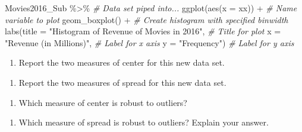 \documentclass[
]{report}
\newenvironment{Shaded}{\begin{snugshade}}{\end{snugshade}}
\newcommand{\AttributeTok}[1]{\textcolor[rgb]{0.77,0.63,0.00}{#1}}
\newcommand{\CommentTok}[1]{\textcolor[rgb]{0.56,0.35,0.01}{\textit{#1}}}
\newcommand{\FunctionTok}[1]{\textcolor[rgb]{0.00,0.00,0.00}{#1}}
\newcommand{\NormalTok}[1]{#1}
\newcommand{\SpecialCharTok}[1]{\textcolor[rgb]{0.00,0.00,0.00}{#1}}
\newcommand{\StringTok}[1]{\textcolor[rgb]{0.31,0.60,0.02}{#1}}
\providecommand{\tightlist}{%
  \setlength{\itemsep}{0pt}\setlength{\parskip}{0pt}}
\begin{document}
\begin{Shaded}
\begin{Highlighting}[]
\NormalTok{Movies2016\_Sub }\SpecialCharTok{\%\textgreater{}\%} \CommentTok{\# Data set piped into...}
\FunctionTok{ggplot}\NormalTok{(}\FunctionTok{aes}\NormalTok{(}\AttributeTok{x =}\NormalTok{ xx)) }\SpecialCharTok{+}   \CommentTok{\# Name variable to plot}
  \FunctionTok{geom\_boxplot}\NormalTok{() }\SpecialCharTok{+}  \CommentTok{\# Create histogram with specified binwidth}
  \FunctionTok{labs}\NormalTok{(}\AttributeTok{title =} \StringTok{"Histogram of Revenue of Movies in 2016"}\NormalTok{, }\CommentTok{\# Title for plot}
       \AttributeTok{x =} \StringTok{"Revenue (in Millions)"}\NormalTok{, }\CommentTok{\# Label for x axis}
       \AttributeTok{y =} \StringTok{"Frequency"}\NormalTok{) }\CommentTok{\# Label for y axis}
\end{Highlighting}
\end{Shaded}

\begin{enumerate}
\def\labelenumi{\arabic{enumi}.}
\setcounter{enumi}{9}
\tightlist
\item
  Report the two measures of center for this new data set.
\end{enumerate}

\vspace{0.8in}

\begin{enumerate}
\def\labelenumi{\arabic{enumi}.}
\setcounter{enumi}{10}
\tightlist
\item
  Report the two measures of spread for this new data set.
\end{enumerate}

\vspace{0.8in}

\begin{enumerate}
\def\labelenumi{\arabic{enumi}.}
\setcounter{enumi}{11}
\tightlist
\item
  Which measure of center is robust to outliers?
\end{enumerate}

\vspace{0.5in}

\begin{enumerate}
\def\labelenumi{\arabic{enumi}.}
\setcounter{enumi}{12}
\tightlist
\item
  Which measure of spread is robust to outliers? Explain your answer.
\end{enumerate}
\end{document}

